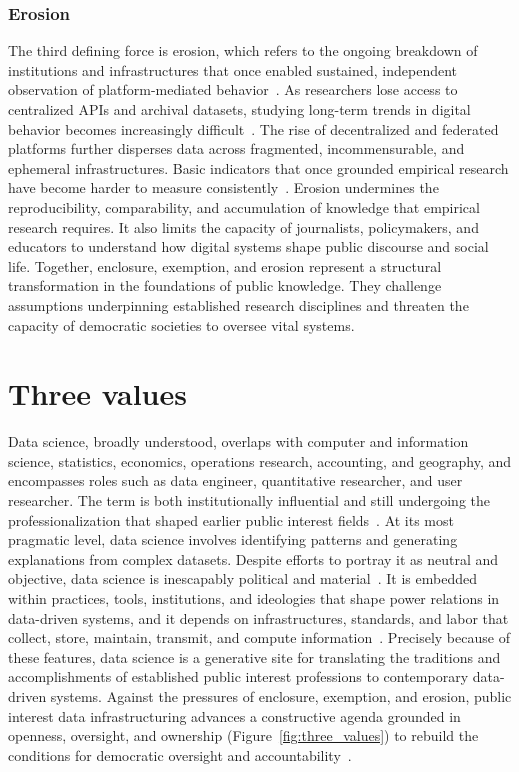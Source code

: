 \documentclass[acmsmall,screen]{acmart}
\begin{document}
\subsubsection*{Erosion}
The third defining force is erosion, which refers to the ongoing breakdown of institutions and infrastructures that once enabled sustained, independent observation of platform-mediated behavior~\cite{Plantin_Infrastructurestudiesmeet_2016}. As researchers lose access to centralized APIs and archival datasets, studying long-term trends in digital behavior becomes increasingly difficult~\cite{Freelon_ComputationalResearchPostAPI_2018}. The rise of decentralized and federated platforms further disperses data across fragmented, incommensurable, and ephemeral infrastructures. Basic indicators that once grounded empirical research have become harder to measure consistently~\cite{Bruns_APIcalypsesocialmedia_2019,nicholson_truthiness_2024}. Erosion undermines the reproducibility, comparability, and accumulation of knowledge that empirical research requires. It also limits the capacity of journalists, policymakers, and educators to understand how digital systems shape public discourse and social life. Together, enclosure, exemption, and erosion represent a structural transformation in the foundations of public knowledge. They challenge assumptions underpinning established research disciplines and threaten the capacity of democratic societies to oversee vital systems.

\section*{Three values}
Data science, broadly understood, overlaps with computer and information science, statistics, economics, operations research, accounting, and geography, and encompasses roles such as data engineer, quantitative researcher, and user researcher. The term is both institutionally influential and still undergoing the professionalization that shaped earlier public interest fields~\cite{passiTrustDataScience2018a,greenDataSciencePolitical2021}. At its most pragmatic level, data science involves identifying patterns and generating explanations from complex datasets. Despite efforts to portray it as neutral and objective, data science is inescapably political and material~\cite{boydCriticalQuestionsBig2012,vandijckDataficationDataismDataveillance2014}. It is embedded within practices, tools, institutions, and ideologies that shape power relations in data-driven systems, and it depends on infrastructures, standards, and labor that collect, store, maintain, transmit, and compute information~\cite{thomerRelationalDataParadigms2020,acker_DataCraftTheory_2019}. Precisely because of these features, data science is a generative site for translating the traditions and accomplishments of established public interest professions to contemporary data-driven systems. Against the pressures of enclosure, exemption, and erosion, public interest data infrastructuring advances a constructive agenda grounded in openness, oversight, and ownership (Figure~\ref{fig:three_values}) to rebuild the conditions for democratic oversight and accountability~\cite{hutchinsonAccountabilityMachineLearning2021,pasquale_black_2016}.
\end{document}
